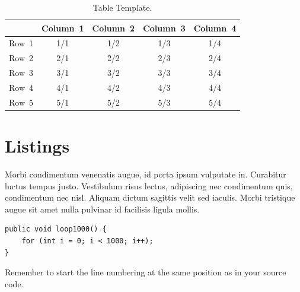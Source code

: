\begin{table}[H]
\centering
\caption{Table Template.}
\label{tab:table_template}
\begin{tabular}{|l||c|c|c|c|}
\hline
 & \textbf{Column~1} & \textbf{Column~2} & \textbf{Column~3} & \textbf{Column~4} \\ \hline

Row~1 & 1/1 & 1/2 & 1/3 & 1/4 \\ \hline
Row~2 & 2/1 & 2/2 & 2/3 & 2/4 \\ \hline
Row~3 & 3/1 & 3/2 & 3/3 & 3/4 \\ \hline
Row~4 & 4/1 & 4/2 & 4/3 & 4/4 \\ \hline
Row~5 & 5/1 & 5/2 & 5/3 & 5/4 \\ \hline

\end{tabular}
\end{table}

\section{Listings}

Morbi condimentum venenatis augue, id porta ipsum vulputate in. Curabitur luctus tempus justo. Vestibulum risus lectus, adipiscing nec condimentum quis, condimentum nec nisl. Aliquam dictum sagittis velit sed iaculis. Morbi tristique augue sit amet nulla pulvinar id facilisis ligula mollis.

\vspace{1em}

\begin{lstlisting}[firstnumber=37, caption={Sample listing.}]
public void loop1000() {
	for (int i = 0; i < 1000; i++);
}
\end{lstlisting}

Remember to start the line numbering at the same position as in your source code.
